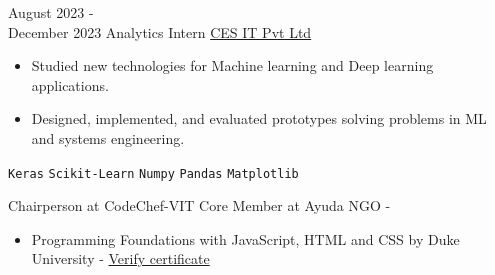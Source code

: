 \documentclass[9pt]{developercv}
\begin{document}
\vspace{-10 pt}
\begin{entrylist}
  \entry
  {August 2023 - \\
    December 2023}
  {Analytics Intern}
  {\href{https://www.cesltd.com/}{CES IT Pvt Ltd}}
  {\vspace{-10pt}
    \begin{itemize}[noitemsep,topsep=0pt,parsep=0pt,partopsep=0pt, leftmargin=-1pt]
      \item {Studied new technologies for Machine learning and Deep learning applications.}
      \item {Designed, implemented, and evaluated prototypes solving problems in ML and systems engineering.}
    \end{itemize}
    \texttt{Keras} \slashsep \texttt{Scikit-Learn} \slashsep \texttt{Numpy} \slashsep \texttt{Pandas} \slashsep \texttt{Matplotlib}}
\end{entrylist}
\vspace{-10 pt}
\vspace{-6pt}

\hspace{26mm} Chairperson at CodeChef-VIT \hspace{20mm}Core Member at Ayuda NGO -   


\vspace{0 pt}
\vspace{-6pt}

\begin{itemize}[noitemsep,topsep=0pt,parsep=0pt,partopsep=0pt, leftmargin=75pt]
  \item Programming Foundations with JavaScript, HTML and CSS by Duke University - \href{https://coursera.org/verify/ZZVTGPTSR36H}{Verify certificate}
\end{itemize}

\end{document}
